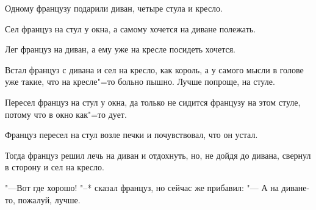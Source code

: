 
Одному  французу подарили диван,  четыре
стула и кресло.
    
Сел француз на стул у окна, а самому хочется на диване полежать.
    
Лег француз на диван, а ему уже на кресле посидеть хочется.
    
Встал француз с  дивана и сел на кресло,
как король, а у самого  мысли  в голове  уже
такие, что на кресле"=то больно пышно.  Лучше
попроще, на стуле.
    
Пересел француз на стул у окна, да только не сидится французу на этом стуле, потому
что в окно как"=то дует.
    
Француз  пересел  на стул возле печки  и
почувствовал, что он устал.
    
Тогда  француз решил лечь на диван и отдохнуть,  но, не дойдя до дивана,  свернул в
сторону и сел на кресло.
     
"---Вот где хорошо!  "--* сказал француз, но
сейчас же прибавил:  "--- А на диване-то, пожалуй, лучше.
